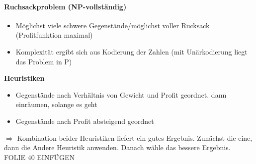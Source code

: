 \documentclass[ngerman]{scrartcl}
\begin{document}
\paragraph*{Ruchsackproblem (NP-vollständig)}
\begin{itemize}
  \item Möglichst viele schwere Gegenstände/möglichst voller Rucksack (Profitfunktion maximal)
  \item Komplexität ergibt sich aus Kodierung der Zahlen (mit Unärkodierung liegt das Problem in P)
\end{itemize}
\textbf{Heuristiken}
\begin{itemize}
  \item Gegenstände nach Verhältnis von Gewicht und Profit geordnet. dann einräumen, solange es geht
  \item Gegenstände nach Profit absteigend geordnet
\end{itemize} 
$ \Rightarrow $ Kombination beider Heuristiken liefert ein gutes Ergebnis. Zunächst die eine, dann die Andere Heuristik anwenden. Danach wähle das bessere Ergebnis.\\
FOLIE 40 EINFÜGEN
\end{document}
